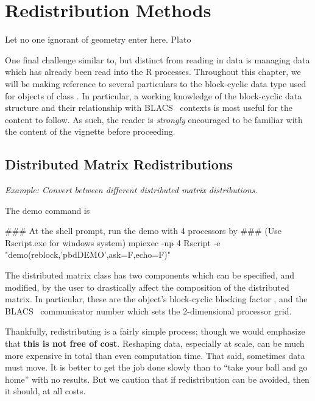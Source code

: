 \chapter{Redistribution Methods}
\label{sec:redist}

\inspire%
{Let no one ignorant of geometry enter here. }%
{Plato}
\vspace{0.5cm}


One final challenge similar to, but distinct from reading in data is managing data which has already been read into the R processes.  Throughout this chapter, we will be making reference to several particulars to the block-cyclic data type used for objects of
class .
In particular, a working knowledge of the block-cyclic data structure and their relationship with BLACS~ contexts is most useful for the content to follow.  As such, the reader is \emph{strongly} encouraged to be familiar with the content of the  vignette before proceeding.

\section{Distributed Matrix Redistributions}
\label{sec:dmatredist}

\emph{Example:  Convert between different distributed matrix distributions.}

The demo command is
\begin{Command}
### At the shell prompt, run the demo with 4 processors by
### (Use Rscript.exe for windows system)
mpiexec -np 4 Rscript -e "demo(reblock,'pbdDEMO',ask=F,echo=F)"
\end{Command}

The distributed matrix class 
has two components which can be specified, and modified, by the user to 
drastically affect the composition of the distributed matrix.  In particular, 
these are the object's block-cyclic blocking factor , and the 
BLACS~ communicator number  which sets the 
2-dimensional processor grid. 

Thankfully, redistributing is a fairly simple process; though we would emphasize 
that \textbf{this is not free of cost}.  Reshaping data, especially at scale, 
can be much more expensive in total than even computation time.  That said, 
sometimes data must move.  It is better to get the job done slowly than to 
``take your ball and go home'' with no results.  But we caution that if 
redistribution can be avoided, then it should, at all costs.

